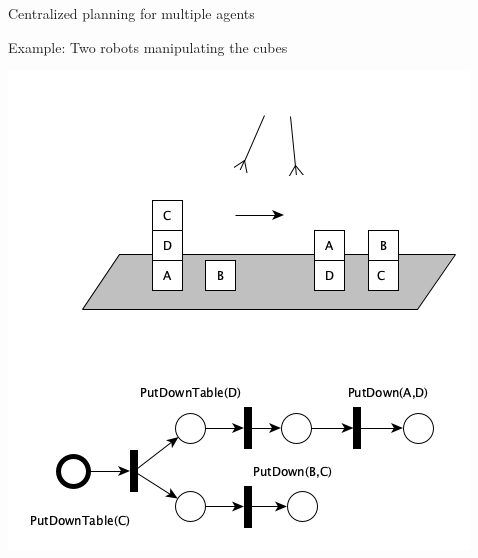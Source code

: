 \documentclass[9pt]{beamer}
\begin{document}
\begin{frame}{Centralized planning for multiple agents}
\begin{small}
\begin{exampleblock}{Example: Two robots manipulating the cubes}
\begin{center}
\includegraphics[scale=0.35]{images/central_planning}
\end{center}
\end{exampleblock}
\end{small}
\end{frame}
\end{document}
